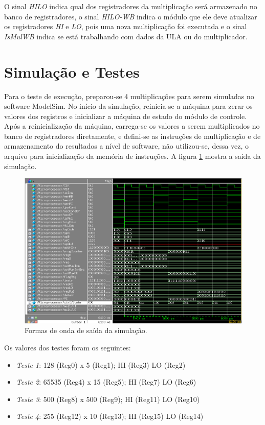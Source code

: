 \documentclass[11pt,a4paper,titlepage]{article}
\begin{document}
O sinal \textit{HILO} indica qual dos registradores da multiplicação será armazenado no banco de registradores, o sinal \textit{HILO-WB} indica o módulo que ele deve atualizar os registradores \textit{HI} e \textit{LO}, pois uma nova multiplicação foi executada e o sinal \textit{IsMulWB} indica se está trabalhando com dados da ULA ou do multiplicador.

\section{Simulação e Testes}

Para o teste de execução, preparou-se 4 multiplicações para serem simuladas no software ModelSim. No início da simulação, reinicia-se a máquina para zerar os valores dos registros e inicializar a máquina de estado do módulo de controle. Após a reinicialização da máquina, carrega-se os valores a serem multiplicados no banco de registradores diretamente, e defini-se as instruções de multiplicação e de armazenamento do resultados a nível de software, não utilizou-se, dessa vez, o arquivo para inicialização da memória de instruções. A figura \ref{fig:modelsim} mostra a saída da simulação. 

\begin{figure}[!h]
\centering
\includegraphics[scale=0.5]{images/sim.png}
\caption{Formas de onda de saída da simulação.}
\label{fig:modelsim}
\end{figure}

Os valores dos testes foram os seguintes:

\begin{itemize}
\item \textit{Teste 1}: 128 (Reg0) x 5 (Reg1); HI (Reg3) LO (Reg2)
\item \textit{Teste 2}: 65535 (Reg4) x 15 (Reg5); HI (Reg7) LO (Reg6)
\item \textit{Teste 3}: 500 (Reg8) x 500 (Reg9); HI (Reg11) LO (Reg10)
\item \textit{Teste 4}: 255 (Reg12) x 10 (Reg13); HI (Reg15) LO (Reg14)
\end{itemize}
\end{document}
